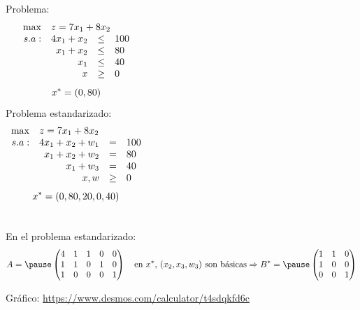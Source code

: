 \documentclass[10pt, aspectratio=169]{beamer}
\begin{document}
\begin{frame}{}
       \vspace{2em}

       \begin{columns}
       Problema:
        \[
        \begin{array}{rrcl}
        \max & \multicolumn{3}{l}{z = 7x_1+8x_2} \\
        s.a: & 4x_1+x_2 & \leq & 100 \\
         & x_1+x_2 & \leq & 80 \\
         & x_1 & \leq & 40 \\
         & x& \geq & 0
        \end{array}
        \]
        \[x^{\ast} = (0, 80)\]
       Problema estandarizado: 
        \[
        \begin{array}{rrcl}
        \max & \multicolumn{3}{l}{z = 7x_1+8x_2} \\
        s.a: & 4x_1+x_2 + w_1 & = & 100 \\
         & x_1+x_2 +w_2 & = & 80 \\
         & x_1  + w_3& = & 40 \\
         & x, w& \geq & 0
        \end{array}
        \]
        \[x^{\ast} = (0, 80, 20, 0, 40)\]
        \end{columns}
        
        En el problema estandarizado:
        \[A = \pause\begin{pmatrix}
        4 & 1 & 1 & 0 & 0 \\
        1 & 1 & 0 & 1 & 0 \\
        1 & 0 & 0 & 0 & 1 
        \end{pmatrix}
        \quad
        \text{en $x^\ast$, $(x_2,x_3,w_3)$ son básicas} \Rightarrow
        B^\ast = \pause\begin{pmatrix}
        1 & 1 & 0 \\
        1 & 0 & 0 \\
        0 & 0 & 1
        \end{pmatrix}
        \]
        
        \vspace{1em}
        Gráfico: \small \color{blue}\url{https://www.desmos.com/calculator/t4sdqkfd6c}

\end{frame}
\end{document}
